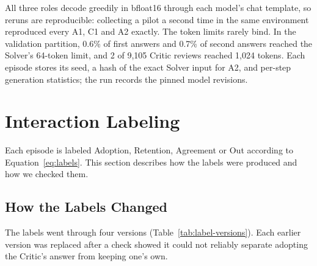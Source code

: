 All three roles decode greedily in bfloat16 through each model's chat
template, so reruns are reproducible: collecting a pilot a second time in the
same environment reproduced every A1, C1 and A2 exactly. The token limits
rarely bind. In the validation partition, 0.6\% of first answers and 0.7\% of
second answers reached the Solver's 64-token limit, and 2 of 9,105 Critic
reviews reached 1,024 tokens. Each episode stores its seed, a hash of the
exact Solver input for A2, and per-step generation statistics; the run
records the pinned model revisions.

\section{Interaction Labeling}
\label{sec:labeling}

Each episode is labeled Adoption, Retention, Agreement or Out according to
Equation~\ref{eq:labels}. This section describes how the labels were produced
and how we checked them.

\subsection{How the Labels Changed}

The labels went through four versions (Table~\ref{tab:label-versions}). Each
earlier version was replaced after a check showed it could not reliably
separate adopting the Critic's answer from keeping one's own.

